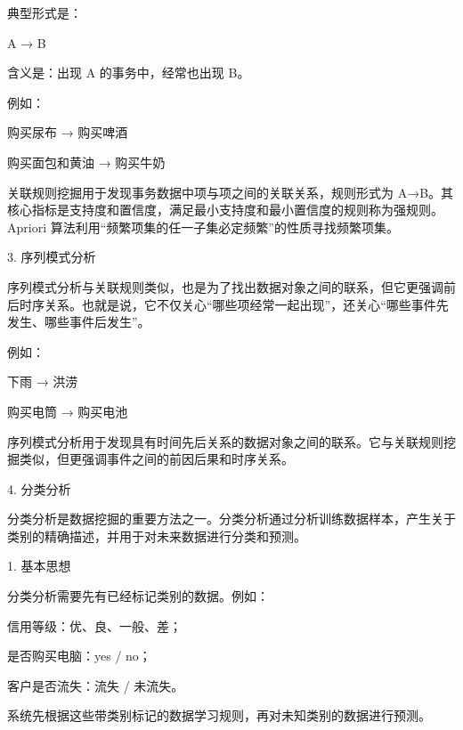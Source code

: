 \documentclass[UTF8,zihao=-4]{ctexart}
\begin{document}
典型形式是：\par

A → B\par

含义是：出现 A 的事务中，经常也出现 B。\par

例如：\par

购买尿布 → 购买啤酒\par
购买面包和黄油 → 购买牛奶\par

关联规则挖掘用于发现事务数据中项与项之间的关联关系，规则形式为 A→B。其核心指标是支持度和置信度，满足最小支持度和最小置信度的规则称为强规则。Apriori 算法利用“频繁项集的任一子集必定频繁”的性质寻找频繁项集。\par

3. 序列模式分析\par

序列模式分析与关联规则类似，也是为了找出数据对象之间的联系，但它更强调前后时序关系。也就是说，它不仅关心“哪些项经常一起出现”，还关心“哪些事件先发生、哪些事件后发生”。\par

例如：\par

下雨 → 洪涝\par
购买电筒 → 购买电池\par

序列模式分析用于发现具有时间先后关系的数据对象之间的联系。它与关联规则挖掘类似，但更强调事件之间的前因后果和时序关系。\par

4. 分类分析\par

分类分析是数据挖掘的重要方法之一。分类分析通过分析训练数据样本，产生关于类别的精确描述，并用于对未来数据进行分类和预测。\par

1. 基本思想\par

分类分析需要先有已经标记类别的数据。例如：\par

信用等级：优、良、一般、差；\par
是否购买电脑：yes / no；\par
客户是否流失：流失 / 未流失。\par

系统先根据这些带类别标记的数据学习规则，再对未知类别的数据进行预测。\par
\end{document}

